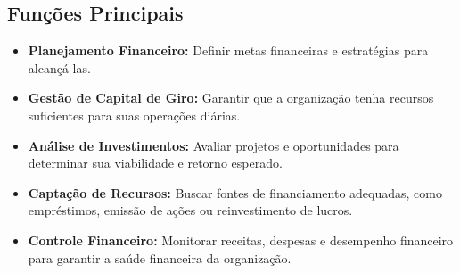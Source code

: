 \documentclass{article}
\begin{document}
\subsection{Funções Principais}
\begin{itemize}
\item \textbf{Planejamento Financeiro:} Definir metas financeiras e estratégias para alcançá-las.
\item \textbf{Gestão de Capital de Giro:} Garantir que a organização tenha recursos suficientes para suas operações diárias.
\item \textbf{Análise de Investimentos:} Avaliar projetos e oportunidades para determinar sua viabilidade e retorno esperado.
\item \textbf{Captação de Recursos:} Buscar fontes de financiamento adequadas, como empréstimos, emissão de ações ou reinvestimento de lucros.
\item \textbf{Controle Financeiro:} Monitorar receitas, despesas e desempenho financeiro para garantir a saúde financeira da organização.
\end{itemize}
\end{document}

